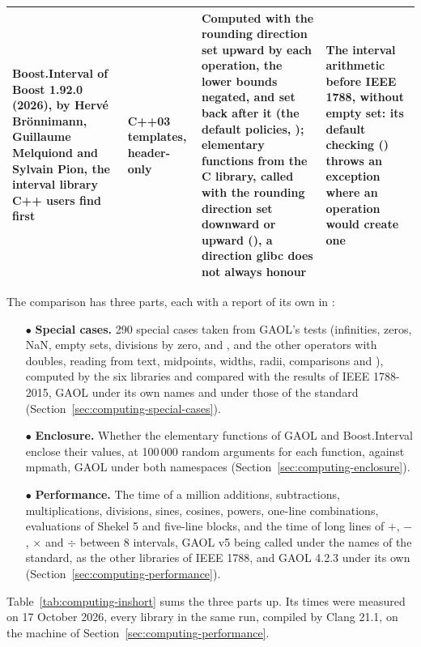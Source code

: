 \documentclass[12pt,a4paper,twoside,openright]{book}
\begin{document}
\begin{longtable}{|L{2.5cm}|L{1.9cm}|L{4.7cm}|L{4.0cm}|}
\hline
Boost.Interval of Boost 1.92.0 (2026), by Herv\'e Br\"onnimann, Guillaume
Melquiond and Sylvain Pion, the interval library C++ users find first &
C++03 templates, header-only & Computed with the rounding direction set
upward by each operation, the lower bounds negated, and set back after it
(the default policies,
\allowbreak{}); elementary
functions from the C library, called with the rounding direction set
downward or upward (), a direction glibc does not
always honour & The interval arithmetic before IEEE 1788, without empty set:
its default checking () throws an exception where an
operation would create one \\
\hline
\end{longtable}
\endgroup

The comparison has three parts, each with a report of its own in
:
\begin{itemize}
\item[$\bullet$] \textbf{Special cases.} 290 special cases taken from
GAOL's tests (infinities, zeros, NaN, empty sets, divisions by zero,
 and , \code{+=} and the other operators with doubles,
reading from text, midpoints, widths, radii, comparisons and ),
computed by the six libraries and compared with the results of IEEE
1788-2015, GAOL under its own names and under those of the standard
(Section~\ref{sec:computing-special-cases}).
\item[$\bullet$] \textbf{Enclosure.} Whether the elementary functions of
GAOL and Boost.Interval enclose their values, at 100\,000 random arguments
for each function, against mpmath, GAOL under both namespaces
(Section~\ref{sec:computing-enclosure}).
\item[$\bullet$] \textbf{Performance.} The time of a million additions,
subtractions, multiplications, divisions, sines, cosines, powers, one-line
combinations, evaluations of Shekel 5 and five-line blocks, and the time of
long lines of $+$, $-$, $\times$ and $\div$ between 8 intervals, GAOL v5
being called under the names of the standard, as the other libraries of IEEE
1788, and GAOL 4.2.3 under its own
(Section~\ref{sec:computing-performance}).
\end{itemize}

\medskip
\noindent Table~\ref{tab:computing-inshort} sums the three parts up. Its
times were measured on 17 October 2026, every library in the same run,
compiled by Clang 21.1, on the machine of
Section~\ref{sec:computing-performance}.
\end{document}
